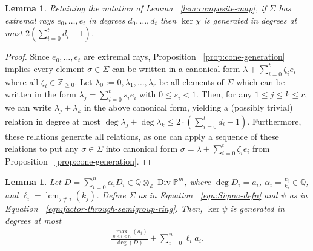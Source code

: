 \documentclass{amsart}
\theoremstyle{plain}
\newtheorem{lem}[thm]{Lemma}
\theoremstyle{definition}
\theoremstyle{remark}
\numberwithin{equation}{subsection}
\newcommand\bq{{\mathbb Q}}
\newcommand\bp{{\mathbb P}}
\newcommand\bz{{\mathbb Z}}
\DeclareMathOperator\di{Div}
\newcommand\bida{a}
\DeclareMathOperator{\lcm}{lcm}
\begin{document}
\begin{lem}
\label{lem:bound-ker-chi}
Retaining the notation of Lemma ~\ref{lem:composite-map}, if $\Sigma$ has
extremal rays $e_0,\ldots, e_t$ in degrees $d_0, \ldots, d_t$ then $\ker \chi$
is generated in degrees at most $2(\sum_{i=0}^{t}d_i-1)$.
\end{lem}
\begin{proof}
Since $e_0, \ldots, e_t$ are extremal rays, Proposition
~\ref{prop:cone-generation} implies every element $\sigma \in \Sigma$ can be written
in a canonical form $\lambda + \sum_{i=0}^{t} \zeta_i e_i$ where all $\zeta_i \in \mathbb{Z}_{\ge 0}$.  Let
$\lambda_0 :=
0,\lambda_1, \ldots, \lambda_r$ be all elements of $\Sigma$ which
can be
written in the form $\lambda_j = \sum_{i=0}^{t}s_i e_i$ with $0
\leq s_i < 1.$ Then, for any $1 \leq j \leq k \leq r,$ we can write $\lambda_j + \lambda_k$ in
the above canonical form, yielding a (possibly trivial) relation in degree at most $\deg \lambda_j
+ \deg \lambda_k\leq 2 \cdot \left( \sum_{i=0}^{t}d_i -1 \right).$
Furthermore, these relations generate all relations, as one can apply a
sequence of these relations to put any $\sigma \in \Sigma$ into canonical form
$\sigma = \lambda + \sum_{i=0}^{t}\zeta_i e_i$ from Proposition
~\ref{prop:cone-generation}.
\end{proof}
\begin{lem}
\label{lem:proj-relations-psi}
Let $D = \sum_{i=0}^{n} \alpha_i D_i \in \bq \otimes_\bz \di \bp^m$, where
$\deg D_i = \bida_i$, $\alpha_i = \frac{c_i}{k_i}\in \bq$, and
$\ell_i = \lcm_{j \neq i} (k_j)$. Define $\Sigma$ as in Equation
~\eqref{eqn:Sigma-defn} and $\psi$ as in Equation
~\eqref{eqn:factor-through-semigroup-ring}. Then, $\ker \psi$ is
generated in degrees at most
\begin{align}
\label{eqn:proj-relation-degree}
	\frac{\max_{0\le i \le n}(\bida_i)}{\deg(D)} +  \sum_{i=0}^n \ell_i a_i.
\end{align}

\end{lem}
\end{document}
